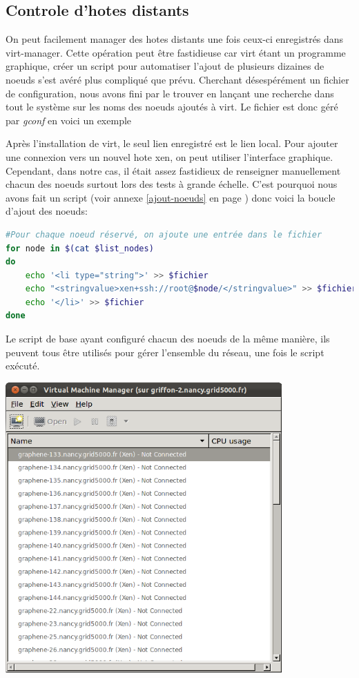 \subsection{Controle d'hotes distants}
On peut facilement manager des hotes distants une fois ceux-ci enregistrés dans virt-manager. Cette opération peut être fastidieuse car virt étant un programme graphique, créer un script pour automatiser l'ajout de plusieurs dizaines de noeuds s'est avéré plus compliqué que prévu.
Cherchant désespérément un fichier de configuration, nous avons fini par le trouver en lançant une recherche dans tout le système sur les noms des noeuds ajoutés à virt. Le fichier est donc géré par \emph{gconf} en voici un exemple

Après l'installation de virt, le seul lien enregistré est le lien local. Pour ajouter une connexion vers un nouvel hote xen, on peut utiliser l'interface graphique.
Cependant, dans notre cas, il était assez fastidieux de renseigner manuellement chacun des noeuds surtout lors des tests à grande échelle. C'est pourquoi nous avons fait un script (voir annexe \ref{ajout-noeuds} en page \pageref{ajout-noeuds}) donc voici la boucle d'ajout des noeuds:
\begin{lstlisting}[language=bash]
#Pour chaque noeud réservé, on ajoute une entrée dans le fichier
for node in $(cat $list_nodes)
do
    echo '<li type="string">' >> $fichier
    echo "<stringvalue>xen+ssh://root@$node/</stringvalue>" >> $fichier
    echo '</li>' >> $fichier
done
\end{lstlisting}
Le script de base ayant configuré chacun des noeuds de la même manière, ils peuvent tous être utilisés pour gérer l'ensemble du réseau, une fois le script exécuté.
\begin{center}
  \includegraphics[width=300pt]{images/virt-ajout_noeuds.png}
\end{center}
